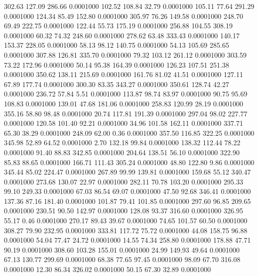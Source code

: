  302.63  127.09  286.66   0.0001000
 102.52  108.84   32.79   0.0001000
 105.11   77.64  291.29   0.0001000
 124.34   85.49  152.80   0.0001000
 305.97   76.26  149.58   0.0001000
 248.70   69.49  222.75   0.0001000
 122.44   55.73  175.19   0.0001000
 256.88  104.55  308.19   0.0001000
  60.32   74.32  248.60   0.0001000
 278.62   63.48  333.43   0.0001000
 140.17  153.37  228.05   0.0001000
  58.13   98.12  140.75   0.0001000
  54.13  105.69  285.65   0.0001000
 307.88  126.81  335.70   0.0001000
  79.32  103.12  261.12   0.0001000
 303.59   73.22  172.96   0.0001000
  50.14   95.38  164.39   0.0001000
 126.23  107.51  251.38   0.0001000
 350.62  138.11  215.69   0.0001000
 161.76   81.02   41.51   0.0001000
 127.11   67.89  177.74   0.0001000
 300.30   83.35  343.27   0.0001000
 350.61  128.74   42.27   0.0001000
 236.72   57.84    5.51   0.0001000
 113.87   98.74   83.97   0.0001000
  90.75   95.69  108.83   0.0001000
 139.01   47.68  181.06   0.0001000
 258.83  120.99   28.19   0.0001000
 355.16   58.80   98.48   0.0001000
  20.74  117.81  191.39   0.0001000
 297.04   98.02  227.77   0.0001000
 120.58  101.40   92.21   0.0001000
  34.96  101.58  162.11   0.0001000
 337.71   65.30   38.29   0.0001000
 248.09   62.00    0.36   0.0001000
 357.50  116.85  322.25   0.0001000
 345.98   52.89   64.52   0.0001000
   2.70  132.18   99.84   0.0001000
 138.32  112.44   78.22   0.0001000
  91.40   88.83  342.85   0.0001000
 204.64  138.51   56.10   0.0001000
 322.90   85.83   88.65   0.0001000
 166.71  111.43  305.24   0.0001000
  48.80  122.80    9.86   0.0001000
 345.44   85.02  224.47   0.0001000
 267.89   99.99  139.81   0.0001000
 159.68   55.12  340.47   0.0001000
 273.68  130.07   22.97   0.0001000
 282.11   70.78  103.20   0.0001000
 295.33   99.10  249.33   0.0001000
  67.03   86.54   69.07   0.0001000
  47.50   92.68  346.41   0.0001000
 137.36   87.16  181.40   0.0001000
 101.87   79.41  101.85   0.0001000
 297.60   96.85  209.65   0.0001000
 230.51   90.50  142.97   0.0001000
 128.08   93.37  316.60   0.0001000
 326.95   55.17    0.46   0.0001000
 270.17   89.43   39.67   0.0001000
  74.65  101.57   60.50   0.0001000
 308.27   79.90  232.95   0.0001000
 333.81  117.72   75.72   0.0001000
  44.08  158.75   96.88   0.0001000
  54.04   77.47   24.72   0.0001000
  14.55   74.34  258.80   0.0001000
 178.88   47.71   90.19   0.0001000
 308.60  103.28  155.01   0.0001000
  24.99  149.93   49.64   0.0001000
  67.13  130.77  299.69   0.0001000
  68.38   77.65   97.45   0.0001000
  98.09   67.70  316.08   0.0001000
  12.30   86.34  326.02   0.0001000
  50.15   67.30   32.89   0.0001000
